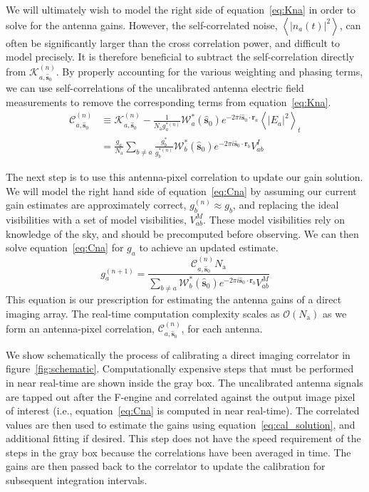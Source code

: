 \documentclass[a4paper,fleqn,usenatbib]{mnras}
\newcommand{\Nant}{\ensuremath{N_{\mathrm{a}}}}
\newcommand{\spix}{\ensuremath{\hat{\mathbf{s}}_{0}}}
\newcommand{\Cna}[1][n]{\ensuremath{\mathcal{C}^{(#1)}_{a,\spix}}}
\newcommand{\Kna}[1][n]{\ensuremath{\mathcal{K}^{(#1)}_{a,\spix}}}
\newcommand{\ra}{\ensuremath{\mathbf{r}_a}}
\newcommand{\rb}{\ensuremath{\mathbf{r}_b}}
\begin{document}
We will ultimately wish to model the right side of equation~\ref{eq:Kna} in order to solve for the
antenna gains. However, the self-correlated noise, $\left<|n_a(t)|^2\right>$, can often be 
significantly larger than the cross correlation power, and difficult to model precisely. It 
is therefore beneficial to subtract the self-correlation directly from $\Kna$. By properly
accounting for the various weighting and phasing terms, we can use self-correlations of the
uncalibrated antenna electric field measurements to remove the corresponding
terms from equation~\ref{eq:Kna}.
\begin{align}\label{eq:Cna}
\Cna & \equiv \Kna - \frac{1}{\Nant g^{*(n)}_a}\mathcal{W}^*_a(\spix)e^{-2\pi i \spix \cdot \ra} \left<|E_a|^2\right>_t\nonumber \\
& = \frac{g_a}{\Nant} \sum_{b\ne a} \frac{g^*_b}{g^{*(n)}_b} \mathcal{W}^*_b(\spix) e^{-2\pi i \spix \cdot \rb} V^I_{ab}
\end{align}

The next step is to use this antenna-pixel correlation to update our gain solution. We will model 
the right hand side of equation~\ref{eq:Cna} by assuming our current gain estimates are 
approximately correct, $g^{(n)}_b\approx g_b$, and replacing the ideal visibilities with a set of 
model visibilities, $V^M_{ab}$. These model visibilities rely on knowledge of the sky, and should 
be precomputed before observing. We can then solve equation~\ref{eq:Cna} for $g_a$ to achieve an 
updated estimate.
\begin{equation}\label{eq:cal_solution}
g^{(n+1)}_a = \frac{\Cna \Nant }{ \sum_{b\ne a} \mathcal{W}^*_b(\spix) e^{-2\pi i \spix \cdot \rb} V^M_{ab} }
\end{equation}
This equation is our prescription for estimating the antenna gains of a direct imaging array. The 
real-time computation complexity scales as $\mathcal{O}(\Nant)$ as we form 
an antenna-pixel correlation, $\Cna$, for each 
antenna. 

We show schematically the process of calibrating a direct imaging correlator in 
figure~\ref{fig:schematic}. Computationally expensive steps that must be performed in near real-time 
are shown inside the gray box. The uncalibrated antenna signals are tapped out after the 
F-engine and correlated against the output image pixel of interest (i.e., equation~\ref{eq:Cna} is 
computed in near real-time). The correlated values are then used to estimate the gains
using equation~\ref{eq:cal_solution}, and additional fitting if desired. This step does not have
the speed requirement of the steps in the gray box because the correlations have been 
averaged in time.
The gains are then passed back 
to the correlator to update the calibration for subsequent integration intervals. 
\end{document}
